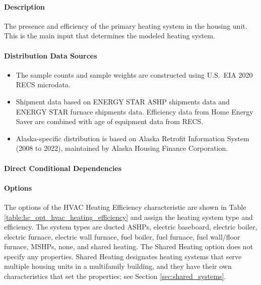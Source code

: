 \paragraph{Description}
% 
The presence and efficiency of the primary heating system in the housing unit. This is the main input that determines the modeled heating system.

\paragraph{Distribution Data Sources}
% 
\begin{itemize}
    \item The sample counts and sample weights are constructed using U.S.~EIA 2020 RECS microdata. 
    \item Shipment data based on ENERGY STAR ASHP shipments data and ENERGY STAR furnace shipments data. Efficiency data from Home Energy Saver are combined with age of equipment data from RECS. 
    \item Alaska-specific distribution is based on Alaska Retrofit Information System (2008 to 2022), maintained by Alaska Housing Finance Corporation.
\end{itemize}

\paragraph{Direct Conditional Dependencies}


\paragraph{Options}
The options of the HVAC Heating Efficiency characteristic are shown in Table \ref{table:hc_opt_hvac_heating_efficiency} and assign the heating system type and efficiency. The system types are ducted ASHPs, electric baseboard, electric boiler, electric furnace, electric wall furnace, fuel boiler, fuel furnace, fuel wall/floor furnace, MSHPs, none, and shared heating. The Shared Heating option does not specify any properties. Shared Heating designates heating systems that serve multiple housing units in a multifamily building, and they have their own characteristics that set the properties; see Section \ref{sec:shared_systems}.



